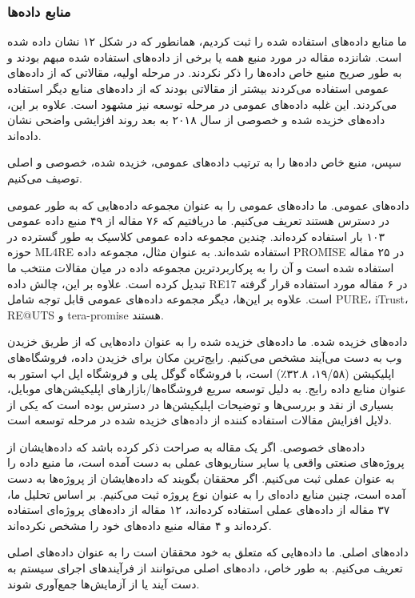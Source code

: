 \documentclass[a4paper,10pt]{article}
\begin{document}
            \subsubsection{منابع داده‌ها}

                ما منابع داده‌های استفاده شده را ثبت کردیم، همانطور که در شکل ۱۲ نشان داده شده است. شانزده مقاله در مورد منبع همه یا برخی از داده‌های استفاده شده مبهم بودند و به طور صریح منبع خاص داده‌ها را ذکر نکردند. در مرحله اولیه، مقالاتی که از داده‌های عمومی استفاده می‌کردند بیشتر از مقالاتی بودند که از داده‌های منابع دیگر استفاده می‌کردند. این غلبه داده‌های عمومی در مرحله توسعه نیز مشهود است. علاوه بر این، داده‌های خزیده شده و خصوصی از سال ۲۰۱۸ به بعد روند افزایشی واضحی نشان داده‌اند.

                سپس، منبع خاص داده‌ها را به ترتیب داده‌های عمومی، خزیده شده، خصوصی و اصلی توصیف می‌کنیم.

                داده‌های عمومی. ما داده‌های عمومی را به عنوان مجموعه داده‌هایی که به طور عمومی در دسترس هستند تعریف می‌کنیم. ما دریافتیم که ۷۶ مقاله از ۴۹ منبع داده عمومی ۱۰۳ بار استفاده کرده‌اند. چندین مجموعه داده عمومی کلاسیک به طور گسترده در حوزه ML4RE استفاده شده‌اند. به عنوان مثال، مجموعه داده PROMISE در ۲۵ مقاله استفاده شده است و آن را به پرکاربردترین مجموعه داده در میان مقالات منتخب ما تبدیل کرده است. علاوه بر این، چالش داده RE17 در ۶ مقاله مورد استفاده قرار گرفته است. علاوه بر این‌ها، دیگر مجموعه داده‌های عمومی قابل توجه شامل PURE، iTrust، RE@UTS و tera-promise هستند.

                داده‌های خزیده شده. ما داده‌های خزیده شده را به عنوان داده‌هایی که از طریق خزیدن وب به دست می‌آیند مشخص می‌کنیم. رایج‌ترین مکان برای خزیدن داده، فروشگاه‌های اپلیکیشن (۱۹/۵۸، ۳۲.۸٪) است، با فروشگاه گوگل پلی و فروشگاه اپل اپ استور به عنوان منابع داده رایج. به دلیل توسعه سریع فروشگاه‌ها/بازارهای اپلیکیشن‌های موبایل، بسیاری از نقد و بررسی‌ها و توضیحات اپلیکیشن‌ها در دسترس بوده است که یکی از دلایل افزایش مقالات استفاده کننده از داده‌های خزیده شده در مرحله توسعه است.

                داده‌های خصوصی. اگر یک مقاله به صراحت ذکر کرده باشد که داده‌هایشان از پروژه‌های صنعتی واقعی یا سایر سناریوهای عملی به دست آمده است، ما منبع داده را به عنوان عملی ثبت می‌کنیم. اگر محققان بگویند که داده‌هایشان از پروژه‌ها به دست آمده است، چنین منابع داده‌ای را به عنوان نوع پروژه ثبت می‌کنیم. بر اساس تحلیل ما، ۳۷ مقاله از داده‌های عملی استفاده کرده‌اند، ۱۲ مقاله از داده‌های پروژه‌ای استفاده کرده‌اند و ۴ مقاله منبع داده‌های خود را مشخص نکرده‌اند.

                داده‌های اصلی. ما داده‌هایی که متعلق به خود محققان است را به عنوان داده‌های اصلی تعریف می‌کنیم. به طور خاص، داده‌های اصلی می‌توانند از فرآیندهای اجرای سیستم به دست آیند یا از آزمایش‌ها جمع‌آوری شوند.
\end{document}
